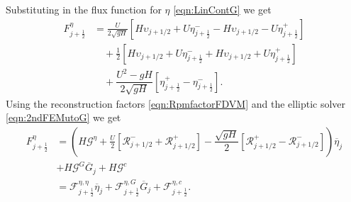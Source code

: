 Substituting in the flux function for $\eta$ \eqref{eqn:LinContG} we get
\begin{align}
F^\eta_{j+\frac{1}{2}} &= \frac{U}{2 \sqrt{gH}} \left[ H\upsilon_{j+1/2} + U\eta^-_{j+\frac{1}{2}} -  H\upsilon_{j+1/2} - U \eta^+_{j+\frac{1}{2}} \right]   \nonumber \\ & \quad + \frac{1}{2}\left[H\upsilon_{j+1/2} + U\eta^-_{j+\frac{1}{2}} +  H\upsilon_{j+1/2} + U \eta^+_{j+\frac{1}{2}}\right] \nonumber \\ &\quad + \dfrac{U^2 - gH}{2\sqrt{g H}} \left [ \eta^+_{j+\frac{1}{2}} - \eta^-_{j+\frac{1}{2}} \right ].
\end{align}
Using the reconstruction factors \eqref{eqn:RpmfactorFDVM} and the elliptic solver \eqref{eqn:2ndFEMutoG} we get
\begin{align}
F^\eta_{j+\frac{1}{2}} &= \left(H\mathcal{G}^{\eta}  + \frac{U}{2}\left[ \mathcal{R}^-_{j+1/2} +  \mathcal{R}^+_{j+1/2}\right]- \dfrac{\sqrt{gH}}{2} \left [ \mathcal{R}^+_{j+1/2} - \mathcal{R}^-_{j+1/2} \right ] \right) \overline{\eta}_j \nonumber \\& + H\mathcal{G}^G \overline{G}_{j} + H \mathcal{G}^c \nonumber \\ &= \mathcal{F}^{\eta, \eta}_{j+\frac{1}{2}} \overline{\eta}_{j} + \mathcal{F}^{\eta, G}_{j+\frac{1}{2}} \overline{G}_{j} + \mathcal{F}^{\eta, c}_{j+\frac{1}{2}} .
\label{eqn:Fluxfactorsubcriteta}
\end{align}

